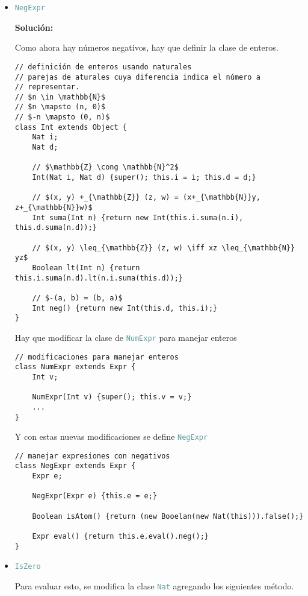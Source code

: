 \documentclass{article}
\newcommand{\tp}[1]{\textcolor{CadetBlue} {\texttt{#1}}}
\newcommand{\tb}[1]{\textcolor{RoyalPurple} {\textbf{#1}}}
\begin{document}
\begin{enumerate}
\begin{enumerate}
            \begin{itemize}
                \item \tp{NegExpr}

                \tb{Solución:}

                Como ahora hay números negativos, hay que definir la clase de
                enteros.

                \begin{verbatim}
// definición de enteros usando naturales
// parejas de aturales cuya diferencia indica el número a
// representar.
// $n \in \mathbb{N}$
// $n \mapsto (n, 0)$
// $-n \mapsto (0, n)$
class Int extends Object {
    Nat i;
    Nat d;

    // $\mathbb{Z} \cong \mathbb{N}^2$
    Int(Nat i, Nat d) {super(); this.i = i; this.d = d;}

    // $(x, y) +_{\mathbb{Z}} (z, w) = (x+_{\mathbb{N}}y, z+_{\mathbb{N}}w)$
    Int suma(Int n) {return new Int(this.i.suma(n.i), this.d.suma(n.d));}

    // $(x, y) \leq_{\mathbb{Z}} (z, w) \iff xz \leq_{\mathbb{N}} yz$
    Boolean lt(Int n) {return this.i.suma(n.d).lt(n.i.suma(this.d));}

    // $-(a, b) = (b, a)$
    Int neg() {return new Int(this.d, this.i);}
}
                \end{verbatim}

                Hay que modificar la clase de \tp{NumExpr} para manejar enteros
                \begin{verbatim}
// modificaciones para manejar enteros
class NumExpr extends Expr {
    Int v;

    NumExpr(Int v) {super(); this.v = v;}
    ...
}
                \end{verbatim}

                Y con estas nuevas modificaciones se define \tp{NegExpr}
                \begin{verbatim}
// manejar expresiones con negativos
class NegExpr extends Expr {
    Expr e;

    NegExpr(Expr e) {this.e = e;}

    Boolean isAtom() {return (new Booelan(new Nat(this))).false();}

    Expr eval() {return this.e.eval().neg();}
}
                \end{verbatim}
                \item \tp{IsZero}

                Para evaluar esto, se modifica la clase \tp{Nat} agregando los
                siguientes método.


\end{itemize}
\end{enumerate}
\end{enumerate}
\end{document}
